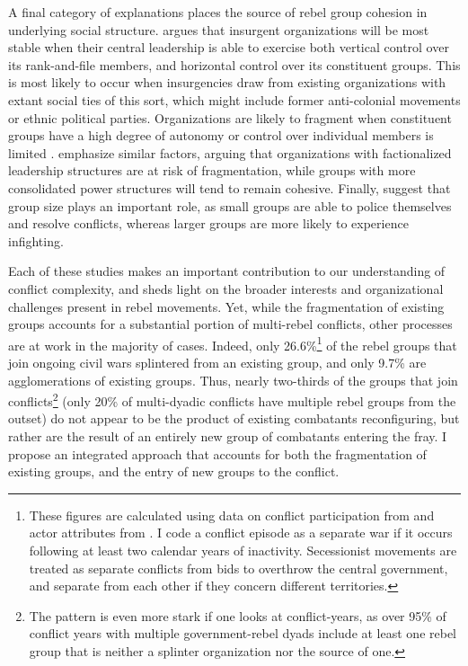 \documentclass[12pt,]{book}
\let\rmarkdownfootnote\footnote%
\def\footnote{\protect\rmarkdownfootnote}
\begin{document}
A final category of explanations places the source of rebel group
cohesion in underlying social structure. \citet{Staniland2014} argues
that insurgent organizations will be most stable when their central
leadership is able to exercise both vertical control over its
rank-and-file members, and horizontal control over its constituent
groups. This is most likely to occur when insurgencies draw from
existing organizations with extant social ties of this sort, which might
include former anti-colonial movements or ethnic political parties.
Organizations are likely to fragment when constituent groups have a high
degree of autonomy or control over individual members is limited
\citep[Ch. 2-3]{Staniland2014}. \citet{Asal2012} emphasize similar
factors, arguing that organizations with factionalized leadership
structures are at risk of fragmentation, while groups with more
consolidated power structures will tend to remain cohesive. Finally,
\citet{Warren2015} suggest that group size plays an important role, as
small groups are able to police themselves and resolve conflicts,
whereas larger groups are more likely to experience infighting.

Each of these studies makes an important contribution to our
understanding of conflict complexity, and sheds light on the broader
interests and organizational challenges present in rebel movements. Yet,
while the fragmentation of existing groups accounts for a substantial
portion of multi-rebel conflicts, other processes are at work in the
majority of cases. Indeed, only 26.6\%\footnote{These figures are
  calculated using data on conflict participation from
  \citet{Pettersson2015a} and actor attributes from \citep{ucdpactor}. I
  code a conflict episode as a separate war if it occurs following at
  least two calendar years of inactivity. Secessionist movements are
  treated as separate conflicts from bids to overthrow the central
  government, and separate from each other if they concern different
  territories.} of the rebel groups that join ongoing civil wars
splintered from an existing group, and only 9.7\% are agglomerations of
existing groups. Thus, nearly two-thirds of the groups that join
conflicts\footnote{The pattern is even more stark if one looks at
  conflict-years, as over 95\% of conflict years with multiple
  government-rebel dyads include at least one rebel group that is
  neither a splinter organization nor the source of one.} (only 20\% of
multi-dyadic conflicts have multiple rebel groups from the outset) do
not appear to be the product of existing combatants reconfiguring, but
rather are the result of an entirely new group of combatants entering
the fray. I propose an integrated approach that accounts for both the
fragmentation of existing groups, and the entry of new groups to the
conflict.
\end{document}

